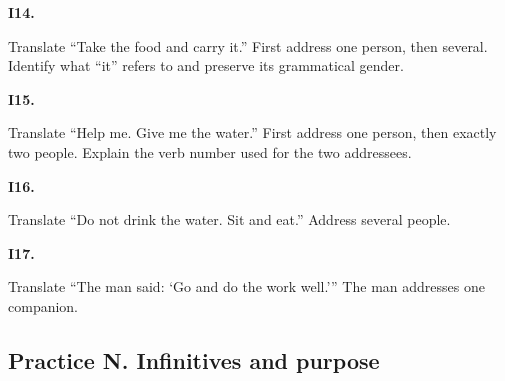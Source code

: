 \par\begin{minipage}{\linewidth}\raggedright
\textbf{I14.}

Translate “Take the food and carry it.” First address one person, then several. Identify what “it” refers to and preserve its grammatical gender.

\end{minipage}\par\addvspace{4pt}

\par\begin{minipage}{\linewidth}\raggedright
\textbf{I15.}

Translate “Help me. Give me the water.” First address one person, then exactly two people. Explain the verb number used for the two addressees.

\end{minipage}\par\addvspace{4pt}

\par\begin{minipage}{\linewidth}\raggedright
\textbf{I16.}

Translate “Do not drink the water. Sit and eat.” Address several people.

\end{minipage}\par\addvspace{4pt}

\par\begin{minipage}{\linewidth}\raggedright
\textbf{I17.}

Translate “The man said: ‘Go and do the work well.’” The man addresses one companion.

\end{minipage}\par\addvspace{4pt}

\subsection*{Practice N. Infinitives and purpose}

